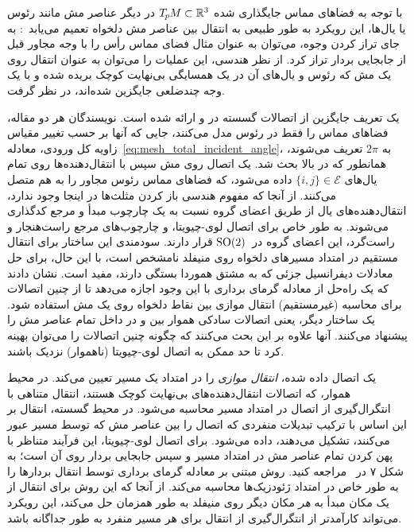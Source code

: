با توجه به فضاهای مماس جایگذاری شده $T_{\mkern-1.5mu p}\mkern-.5muM \subset \mathbb{R}^3$ در دیگر عناصر مش مانند رئوس یا یال‌ها، این رویکرد به طور طبیعی به انتقال بین عناصر مش دلخواه تعمیم می‌یابد~\cite{deHaan2020meshCNNs}:
به جای تراز کردن وجوه، می‌توان به عنوان مثال فضای مماس رأس را با وجه مجاور قبل از جابجایی بردار تراز کرد.
از نظر هندسی، این عملیات را می‌توان به عنوان انتقال روی یک مش که رئوس و یال‌های آن در یک همسایگی بی‌نهایت کوچک بریده شده و با یک وجه چندضلعی جایگزین شده‌اند، در نظر گرفت.


یک تعریف جایگزین از اتصالات گسسته در \cite{Knoppel:2013:GOD} و \cite{Sharp2019VectorHeatMethod} ارائه شده است.
نویسندگان هر دو مقاله، فضاهای مماس را فقط در رئوس مدل می‌کنند، جایی که آنها بر حسب تغییر مقیاس زاویه کل ورودی، معادله~\eqref{eq:mesh_total_incident_angle}، به $2\pi$ تعریف می‌شوند، همانطور که در بالا بحث شد.
یک اتصال روی مش سپس با انتقال‌دهنده‌ها روی تمام یال‌های $\{i,j\} \in\mathcal{E}$ داده می‌شود، که فضاهای مماس رئوس مجاور را به هم متصل می‌کنند.
از آنجا که مفهوم هندسی باز کردن مثلث‌ها در اینجا وجود ندارد، انتقال‌دهنده‌های یال از طریق اعضای گروه نسبت به یک چارچوب مبدأ و مرجع کدگذاری می‌شوند.
به طور خاص برای اتصال لوی-چیویتا، و چارچوب‌های مرجع راست‌هنجار و راست‌گرد، این اعضای گروه در~$\operatorname{SO}(2)$ قرار دارند.
سودمندی این ساختار برای انتقال مستقیم در امتداد مسیرهای دلخواه روی منیفلد نامشخص است، با این حال، برای حل معادلات دیفرانسیل جزئی که به مشتق هموردا بستگی دارند، مفید است.
\citet{Sharp2019VectorHeatMethod} نشان دادند که یک راه‌حل از معادله گرمای برداری با این وجود اجازه می‌دهد تا از چنین اتصالات برای محاسبه (غیرمستقیم) انتقال موازی بین نقاط دلخواه روی یک مش استفاده شود.
\citet{liu2016discreteConnection} یک ساختار دیگر، یعنی اتصالات سادکی هموار بین و در داخل تمام عناصر مش را پیشنهاد می‌کنند.
آنها علاوه بر این بحث می‌کنند که چگونه چنین اتصالات را می‌توان بهینه کرد تا حد ممکن به اتصال لوی-چیویتا (ناهموار) نزدیک باشند.


یک اتصال داده شده، \emph{انتقال موازی} را در امتداد یک مسیر تعیین می‌کند.
در محیط هموار، که اتصالات انتقال‌دهنده‌های بی‌نهایت کوچک هستند، انتقال متناهی با انتگرال‌گیری از اتصال در امتداد مسیر محاسبه می‌شود.
در محیط گسسته، انتقال بر این اساس با ترکیب تبدیلات منفردی که اتصال را بین عناصر مش که توسط مسیر عبور می‌کنند، تشکیل می‌دهند، داده می‌شود.
برای اتصال لوی-چیویتا، این فرآیند متناظر با پهن کردن تمام عناصر مش در امتداد مسیر و سپس جابجایی بردار روی آن است؛ به شکل ۷ در~\cite{lai2009metric} مراجعه کنید.
روش مبتنی بر معادله گرمای برداری توسط \citet{Sharp2019VectorHeatMethod} انتقال بردارها را به طور خاص در امتداد ژئودزیک‌ها محاسبه می‌کند.
از آنجا که این روش برای انتقال از یک مکان مبدأ به \emph{هر} مکان دیگر روی منیفلد به طور همزمان حل می‌کند، این رویکرد می‌تواند کارآمدتر از انتگرال‌گیری از انتقال برای هر مسیر منفرد به طور جداگانه باشد.


